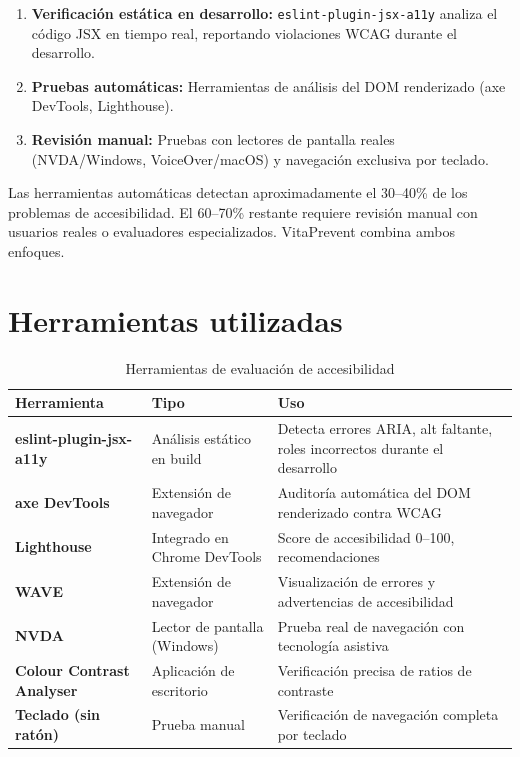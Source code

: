 \documentclass[12pt, a4paper]{report}
\begin{document}
\begin{enumerate}
  \item \textbf{Verificación estática en desarrollo:} \texttt{eslint-plugin-jsx-a11y} analiza el código JSX en tiempo real, reportando violaciones WCAG durante el desarrollo.
  \item \textbf{Pruebas automáticas:} Herramientas de análisis del DOM renderizado (axe DevTools, Lighthouse).
  \item \textbf{Revisión manual:} Pruebas con lectores de pantalla reales (NVDA/Windows, VoiceOver/macOS) y navegación exclusiva por teclado.
\end{enumerate}

\begin{warnbox}
Las herramientas automáticas detectan aproximadamente el 30--40\% de los problemas de accesibilidad. El 60--70\% restante requiere revisión manual con usuarios reales o evaluadores especializados. VitaPrevent combina ambos enfoques.
\end{warnbox}

\section{Herramientas utilizadas}

\begin{table}[H]
\centering
\caption{Herramientas de evaluación de accesibilidad}
\label{tab:herramientas}
\begin{tabular}{@{}>{\bfseries}p{3.5cm} p{5cm} p{5.5cm}@{}}
\toprule
\rowcolor{royalblue!12}
\textbf{Herramienta} & \textbf{Tipo} & \textbf{Uso} \\
\midrule
eslint-plugin-jsx-a11y & Análisis estático en build & Detecta errores ARIA, alt faltante, roles incorrectos durante el desarrollo \\
axe DevTools & Extensión de navegador & Auditoría automática del DOM renderizado contra WCAG \\
Lighthouse & Integrado en Chrome DevTools & Score de accesibilidad 0--100, recomendaciones \\
WAVE & Extensión de navegador & Visualización de errores y advertencias de accesibilidad \\
NVDA & Lector de pantalla (Windows) & Prueba real de navegación con tecnología asistiva \\
Colour Contrast Analyser & Aplicación de escritorio & Verificación precisa de ratios de contraste \\
Teclado (sin ratón) & Prueba manual & Verificación de navegación completa por teclado \\
\bottomrule
\end{tabular}
\end{table}
\end{document}
